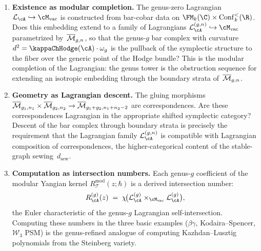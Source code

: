 \begin{enumerate}[label=\textup{(\roman*${}'$)}]
\item \textbf{Existence as modular completion.}
 The genus-zero Lagrangian $\cL_\cA \hookrightarrow \Mvac$ is
 constructed from bar-cobar data on
 $\FM_k(\C) \times \mathrm{Conf}_k^{<}(\R)$. Does this embedding
 extend to a family of Lagrangians
 $\cL_\cA^{(g,n)} \hookrightarrow \Mvac$ parametrized
 by~$\overline{\mathcal M}_{g,n}$, so that the genus-$g$ bar complex with curvature
 $d^2 = \kappaChHodge(\cA) \cdot \omega_g$ is the pullback of the
 symplectic structure to the fiber over the generic point of the
 Hodge bundle? This is the modular completion of the Lagrangian:
 the genus tower is the obstruction sequence for extending an
 isotropic embedding through the boundary strata
 of~$\overline{\mathcal M}_{g,n}$.

\item \textbf{Geometry as Lagrangian descent.}
 The gluing morphisms $\overline{\mathcal M}_{g_1,n_1} \times \overline{\mathcal M}_{g_2,n_2}
 \to \overline{\mathcal M}_{g_1+g_2,n_1+n_2-2}$ are correspondences. Are these
 correspondences Lagrangian in the appropriate shifted symplectic
 category? Descent of the bar complex through boundary strata is
 precisely the requirement that the Lagrangian family
 $\cL_\cA^{(g,n)}$ is compatible with Lagrangian composition of
 correspondences, the higher-categorical content of the stable-graph
 sewing~$d_{\mathrm{sew}}$.

\item \textbf{Computation as intersection numbers.}
 Each genus-$g$ coefficient of the modular Yangian kernel
 $R^{\mathrm{mod}}_{\mathcal{T}}(z;\hbar)$ is a derived
 intersection number:
 \[
 R^{(g)}_\cA(z)
 \;=\;
 \chi\!\bigl(
 \cL_\cA^{(g)} \times_{\Mvac} \cL_\cA^{(g)}
 \bigr),
 \]
 the Euler characteristic of the genus-$g$ Lagrangian
 self-intersection. Computing these numbers in the three basic
 examples ($\beta\gamma$, Kodaira--Spencer, $\mathcal{W}_3$ PSM) is
 the genus-refined analogue of computing Kazhdan--Lusztig
 polynomials from the Steinberg variety.
\end{enumerate}

\medskip

